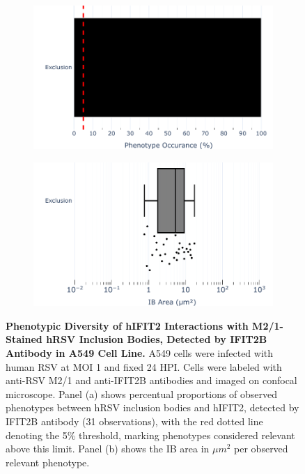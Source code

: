 \begin{figure}
    \begin{subfigure}{0.495\textwidth}
        \caption{}
        \includegraphics[width=1\linewidth]{08. Chapter 3/Figs/02. Infection/02. IFIT2/02. IFIT2B/07. bar_i2b_a549-m21.pdf} 
    \end{subfigure}
    \begin{subfigure}{0.495\textwidth}
        \caption{}
        \includegraphics[width=1\linewidth]{08. Chapter 3/Figs/02. Infection/02. IFIT2/02. IFIT2B/08. box_i2b_a549-m21.pdf}
    \end{subfigure}
    \caption[Phenotypic Diversity of hIFIT2 Interactions with M2/1-Stained hRSV Inclusion Bodies, Detected by IFIT2B Antibody in A549 Cell Line.]{\textbf{Phenotypic Diversity of hIFIT2 Interactions with M2/1-Stained hRSV Inclusion Bodies, Detected by IFIT2B Antibody in A549 Cell Line.} A549 cells were infected with human RSV at MOI 1 and fixed 24 HPI. Cells were labeled with anti-RSV M2/1 and anti-IFIT2B antibodies and imaged on confocal microscope. Panel (a) shows percentual proportions of observed phenotypes between hRSV inclusion bodies and hIFIT2, detected by IFIT2B antibody (31 observations), with the red dotted line denoting the 5\% threshold, marking phenotypes considered relevant above this limit. Panel (b) shows the IB area in \(\mu m^2\) per observed relevant phenotype.}
    \label{fig:Phenotypic Diversity of hIFIT2 Interactions with M2/1-Stained hRSV Inclusion Bodies, Detected by IFIT2B Antibody in A549 Cell Line}
\end{figure}

